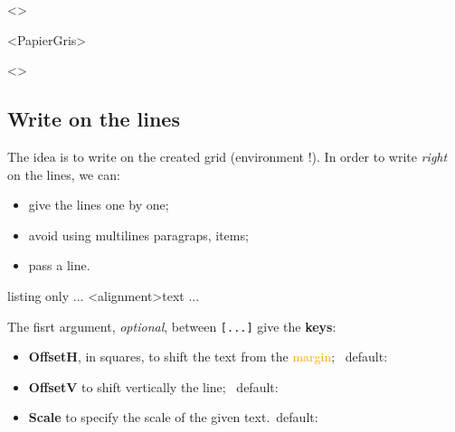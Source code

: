 \documentclass[a4paper]{article}
\newcommand\Cle[1]{{\bfseries\sffamily\textlangle #1\textrangle}}
\begin{document}
\medskip

\begin{EnvGrid}[NumSquares=18x4,Grid=Seyes,Margin=3]<\ColSeyes>
\end{EnvGrid}

\smallskip

\begin{EnvGrid}[NumSquares=36x8,Enlarge=3/3]<PapierGris>
\end{EnvGrid}

\smallskip

\begin{center}
	\begin{EnvGrid}[NumSquares=12x3,Grid=Ruled,Margin=2]<\ColRuled>
	\end{EnvGrid}
\end{center}

\pagebreak

\subsection{Write on the lines}

The idea is to write on the created grid (environment !). In order to write \textit{right} on the lines, we can:

\begin{itemize}
	\item give the lines one by one;
	\item avoid using multilines paragraps, items;
	\item pass a line.
\end{itemize}

\begin{PresentationCode}{listing only}
...
	\WriteLine[keys]<alignment>{text}
	\PassLine
...
\end{PresentationCode}

The fisrt argument, \textit{optional}, between \texttt{[...]} give the \Cle{keys}:

\begin{itemize}
	\item \Cle{OffsetH}, in squares, to shift the text from the \textcolor{orange}{margin}; \hfill~default: \Cle{0}
	\item \Cle{OffsetV} to shift vertically the line; \hfill~default: \Cle{0pt}
	\item \Cle{Scale} to specify the scale of the given text.\hfill~default: \Cle{1}
\end{itemize}
\end{document}
